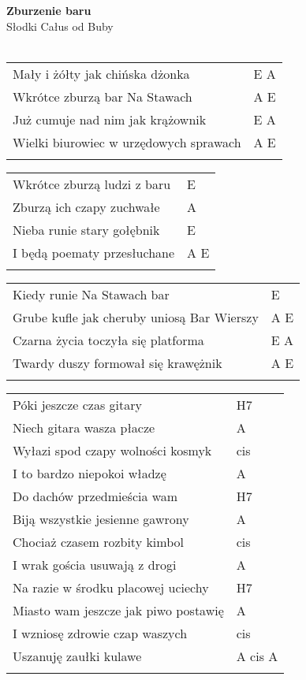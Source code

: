 \documentclass[a5paper]{article}
\begin{document}


\noindent
\fontsize{12pt}{15pt}\selectfont
\textbf{Zburzenie baru} \\
\fontsize{8pt}{10pt}\selectfont
Słodki Całus od Buby \\ \\
\fontsize{10pt}{12pt}\selectfont
{}
\begin{tabular}{@{}p{8.50cm}p{3cm}@{}}
\noindent
Mały i żółty jak chińska dżonka & E A \\
Wkrótce zburzą bar Na Stawach & A E \\
Już cumuje nad nim jak krążownik & E A \\
Wielki biurowiec w urzędowych sprawach & A E \\ \\
\end{tabular}

\noindent
\begin{tabular}{@{}p{7.50cm}p{3cm}@{}}
Wkrótce zburzą ludzi z baru & E \\
Zburzą ich czapy zuchwałe & A \\
Nieba runie stary gołębnik & E \\
I będą poematy przesłuchane & A E \\ \\
\end{tabular}

\noindent
\begin{tabular}{@{}p{8.50cm}p{3cm}@{}}
Kiedy runie Na Stawach bar & E \\
Grube kufle jak cheruby uniosą Bar Wierszy & A E \\
Czarna życia toczyła się platforma & E A \\
Twardy duszy formował się krawężnik & A E \\ \\
\end{tabular}

\noindent
\begin{tabular}{@{}p{7.50cm}p{3cm}@{}}
Póki jeszcze czas gitary & H7 \\
Niech gitara wasza płacze & A \\
Wyłazi spod czapy wolności kosmyk & cis \\
I to bardzo niepokoi władzę & A \\
Do dachów przedmieścia wam & H7 \\
Biją wszystkie jesienne gawrony & A \\
Chociaż czasem rozbity kimbol & cis \\
I wrak gościa usuwają z drogi & A \\
Na razie w środku placowej uciechy & H7 \\
Miasto wam jeszcze jak piwo postawię & A \\
I wzniosę zdrowie czap waszych & cis \\
Uszanuję zaułki kulawe & A cis A \\ \\
\end{tabular}
\end{document}
